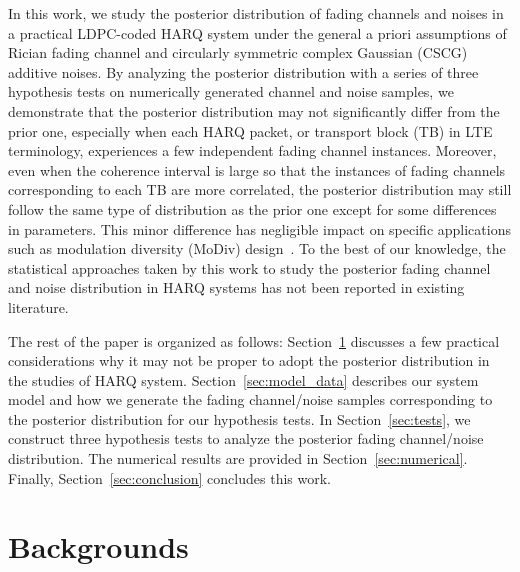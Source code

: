 \documentclass[journal,draftcls,onecolumn,12pt,twoside]{IEEEtran}
\begin{document}
In this work, we study the posterior distribution of fading channels and noises
in a practical LDPC-coded HARQ system under the general a priori assumptions of
Rician fading channel and circularly symmetric complex Gaussian (CSCG)
additive noises. By analyzing the posterior distribution with a series of three
hypothesis tests on numerically generated channel and noise samples, we
demonstrate that the posterior distribution may not significantly differ from
the prior one, especially when each HARQ packet, or transport block (TB) in LTE
terminology, experiences a few independent fading channel instances. 
Moreover, even when the coherence interval is large so that the instances of
fading channels corresponding to each TB are more correlated, the posterior
distribution may still follow the same type of distribution as the prior one
except for some differences in parameters. This minor difference has negligible
impact on specific applications such as modulation diversity (MoDiv)
design~\cite{wu2015modulation}\cite{harvind2005symbol}. To the best of our
knowledge, the statistical approaches taken by this work to study the posterior fading channel and noise
distribution in HARQ systems has not been reported in existing literature.

The rest of the paper is organized as follows:
Section~\ref{sec:backgrounds} discusses a few
practical considerations why it may not be proper to adopt the posterior
distribution in the studies of HARQ system. Section~\ref{sec:model_data}
describes our system model and how we generate the fading channel/noise samples
corresponding to the posterior distribution for our hypothesis tests.
In Section~\ref{sec:tests}, we construct three hypothesis tests to analyze the
posterior fading channel/noise distribution. The numerical results are provided
in Section~\ref{sec:numerical}. Finally, Section~\ref{sec:conclusion} concludes
this work.


\section{Backgrounds}
\label{sec:backgrounds}
\end{document}
